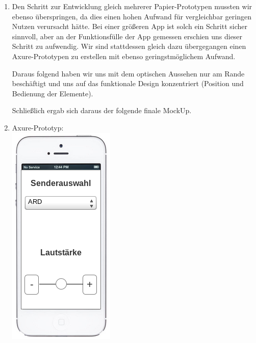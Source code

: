 \documentclass[a4paper,10pt]{scrartcl}
\begin{document}
\begin{enumerate}
		\item
		Den Schritt zur Entwicklung gleich mehrerer Papier-Prototypen mussten wir ebenso überspringen, da dies einen hohen Aufwand für vergleichbar geringen Nutzen verursacht hätte. Bei einer größeren App ist solch ein Schritt sicher sinnvoll, aber an der Funktionsfülle der App gemessen erschien uns dieser Schritt zu aufwendig. Wir sind stattdessen gleich dazu übergegangen einen Axure-Prototypen zu erstellen mit ebenso geringstmöglichem Aufwand.
		
		Daraus folgend haben wir uns mit dem optischen Aussehen nur am Rande beschäftigt und uns auf das funktionale Design konzentriert (Position und Bedienung der Elemente).
		
		Schließlich ergab sich daraus der folgende finale MockUp.
		
		\item Axure-Prototyp:\\
		\includegraphics[scale=0.5]{AxurePrototyp}
		
	\end{enumerate}
\end{document}
